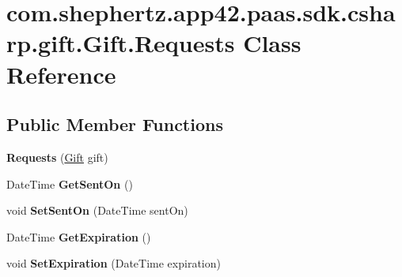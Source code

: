 \hypertarget{classcom_1_1shephertz_1_1app42_1_1paas_1_1sdk_1_1csharp_1_1gift_1_1_gift_1_1_requests}{\section{com.\+shephertz.\+app42.\+paas.\+sdk.\+csharp.\+gift.\+Gift.\+Requests Class Reference}
\label{classcom_1_1shephertz_1_1app42_1_1paas_1_1sdk_1_1csharp_1_1gift_1_1_gift_1_1_requests}
}
\subsection*{Public Member Functions}
\begin{DoxyCompactItemize}
\item 
\hypertarget{classcom_1_1shephertz_1_1app42_1_1paas_1_1sdk_1_1csharp_1_1gift_1_1_gift_1_1_requests_a52809363fcf89c5d24ee72087e1d2658}{{\bfseries Requests} (\hyperlink{classcom_1_1shephertz_1_1app42_1_1paas_1_1sdk_1_1csharp_1_1gift_1_1_gift}{Gift} gift)}\label{classcom_1_1shephertz_1_1app42_1_1paas_1_1sdk_1_1csharp_1_1gift_1_1_gift_1_1_requests_a52809363fcf89c5d24ee72087e1d2658}

\item 
\hypertarget{classcom_1_1shephertz_1_1app42_1_1paas_1_1sdk_1_1csharp_1_1gift_1_1_gift_1_1_requests_a2004cf561fd514eaefa5e508f14b9fe2}{Date\+Time {\bfseries Get\+Sent\+On} ()}\label{classcom_1_1shephertz_1_1app42_1_1paas_1_1sdk_1_1csharp_1_1gift_1_1_gift_1_1_requests_a2004cf561fd514eaefa5e508f14b9fe2}

\item 
\hypertarget{classcom_1_1shephertz_1_1app42_1_1paas_1_1sdk_1_1csharp_1_1gift_1_1_gift_1_1_requests_a745331c4e0e612897d3f5dc1e10ac5af}{void {\bfseries Set\+Sent\+On} (Date\+Time sent\+On)}\label{classcom_1_1shephertz_1_1app42_1_1paas_1_1sdk_1_1csharp_1_1gift_1_1_gift_1_1_requests_a745331c4e0e612897d3f5dc1e10ac5af}

\item 
\hypertarget{classcom_1_1shephertz_1_1app42_1_1paas_1_1sdk_1_1csharp_1_1gift_1_1_gift_1_1_requests_a03dc9c7065bfe8137f4a6bf7eddff5c7}{Date\+Time {\bfseries Get\+Expiration} ()}\label{classcom_1_1shephertz_1_1app42_1_1paas_1_1sdk_1_1csharp_1_1gift_1_1_gift_1_1_requests_a03dc9c7065bfe8137f4a6bf7eddff5c7}

\item 
\hypertarget{classcom_1_1shephertz_1_1app42_1_1paas_1_1sdk_1_1csharp_1_1gift_1_1_gift_1_1_requests_a7d2e95a83b5b5190cf19eb5508ca209a}{void {\bfseries Set\+Expiration} (Date\+Time expiration)}\label{classcom_1_1shephertz_1_1app42_1_1paas_1_1sdk_1_1csharp_1_1gift_1_1_gift_1_1_requests_a7d2e95a83b5b5190cf19eb5508ca209a}


\end{DoxyCompactItemize}

